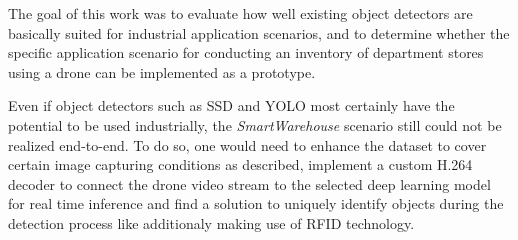 \documentclass[a4paper, 10pt, journal]{wissarbIEEE}      %
\begin{document}
The goal of this work was to evaluate how well existing object detectors are basically suited for industrial application scenarios, and to determine whether the specific application scenario for conducting an inventory of department stores using a drone can be implemented as a prototype. 

Even if object detectors such as SSD and YOLO most certainly have the potential to be used industrially, the \textit{SmartWarehouse} scenario still could not be realized end-to-end. To do so, one would need to enhance the dataset to cover certain image capturing conditions as described, implement a custom H.264 decoder to connect the drone video stream to the selected deep learning model for real time inference and find a solution to uniquely identify objects during the detection process like additionaly making use of RFID technology. 


\end{document}
